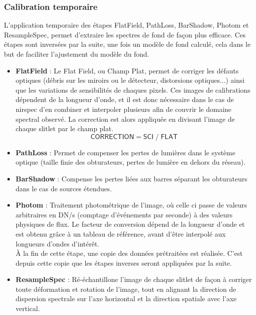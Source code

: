 \documentclass[11pt, a4paper]{article}
\begin{document}
\subsubsection{Calibration temporaire}

L'application temporaire des étapes FlatField, PathLoss, BarShadow, Photom et ResampleSpec, permet d'extraire les spectres de fond de façon plus efficace. Ces étapes sont inversées par la suite, une fois un modèle de fond calculé, cela dans le but de faciliter l'ajustement du modèle du fond.

\begin{itemize}
  \item \textbf{FlatField} : Le Flat Field, ou Champ Plat, permet de corriger les défauts optiques (débris sur les miroirs ou le détecteur, distorsions optiques...) ainsi que les variations de sensibilités de chaques pixels. Ces images de calibrations dépendent de la longueur d'onde, et il est donc nécessaire dans le cas de \gls{nirspec} d'en combiner et interpoler plusieurs afin de couvrir le domaine spectral observé. La correction est alors appliquée en divisant l'image de chaque slitlet par le champ plat.
  \begin{equation}
    \mathsf{CORRECTION} = \mathsf{SCI} \; / \; \mathsf{FLAT} 
  \end{equation}

  \item \textbf{PathLoss} : Permet de compenser les pertes de lumières dans le système optique (taille finie des obturateurs, pertes de lumière en dehors du réseau).
  
  \item \textbf{BarShadow} : Compense les pertes liées aux barres séparant les obturateurs dans le cas de sources étendues.
  
  \item \textbf{Photom} : Traitement photométrique de l'image, où celle ci passe de valeurs arbitraires en DN/s (comptage d'événements par seconde) à des valeurs physiques de flux. Le facteur de conversion dépend de la longueur d'onde et est obtenu grâce à un tableau de référence, avant d'être interpolé aux longueurs d'ondes d'intérêt.\\
  
  À la fin de cette étape, une copie des données prétraitées est réalisée. C'est depuis cette copie que les étapes inverses seront appliquées par la suite.
  
  \item \textbf{ResampleSpec} : Ré-échantillone l'image de chaque slitlet de façon à corriger toute déformation et rotation de l'image, tout en alignant la direction de dispersion spectrale sur l'axe horizontal et la direction spatiale avec l'axe vertical.
\end{itemize}
\end{document}
